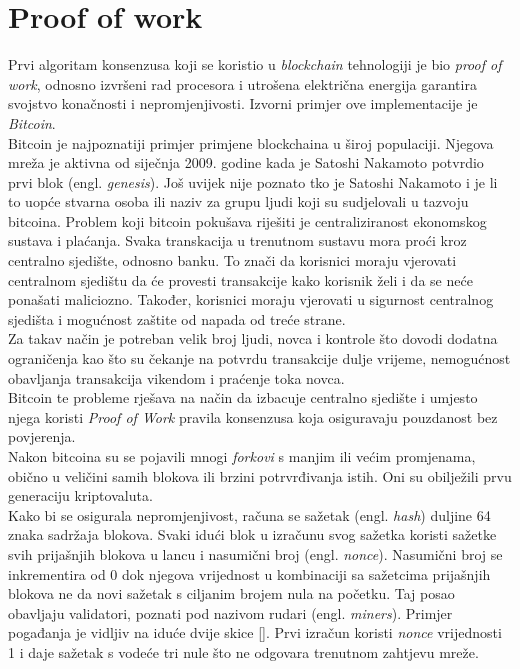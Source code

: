 \documentclass[times, utf8, zavrsni]{fer}
\begin{document}
\section{Proof of work}
Prvi algoritam konsenzusa koji se koristio u \emph{blockchain} tehnologiji je bio \emph{proof of work}, odnosno izvršeni rad procesora i utrošena električna energija
garantira svojstvo konačnosti i nepromjenjivosti. Izvorni primjer ove implementacije je \emph{Bitcoin}. \\
Bitcoin je najpoznatiji primjer primjene blockchaina u široj populaciji. Njegova mreža je aktivna 
od siječnja 2009. godine kada je Satoshi Nakamoto potvrdio prvi blok (engl. \emph{genesis}).
Još uvijek nije poznato tko je Satoshi Nakamoto i je li to uopće stvarna osoba ili naziv za grupu
ljudi koji su sudjelovali u tazvoju bitcoina. Problem koji bitcoin pokušava riješiti je centraliziranost
ekonomskog sustava i plaćanja. Svaka transkacija u trenutnom sustavu mora proći kroz centralno sjedište,
odnosno banku. To znači da korisnici moraju vjerovati centralnom sjedištu da će provesti transakcije
kako korisnik želi i da se neće ponašati maliciozno. Također, korisnici moraju vjerovati u sigurnost
centralnog sjedišta i mogućnost zaštite od napada od treće strane. \\
Za takav način je potreban velik broj ljudi, novca i kontrole što dovodi dodatna ograničenja kao što 
su čekanje na potvrdu transakcije dulje vrijeme, nemogućnost obavljanja transakcija vikendom i praćenje
toka novca. \\
Bitcoin te probleme rješava na način da izbacuje centralno sjedište i umjesto njega koristi \emph{Proof of Work}
pravila konsenzusa koja osiguravaju pouzdanost bez povjerenja. \\
Nakon bitcoina su se pojavili mnogi \emph{forkovi} s manjim ili većim promjenama, obično u veličini
samih blokova ili brzini potrvrđivanja istih. Oni su obilježili prvu generaciju kriptovaluta. \\
Kako bi se osigurala nepromjenjivost, računa se sažetak (engl. \emph{hash}) duljine 64 znaka sadržaja blokova. 
Svaki idući blok u izračunu svog sažetka koristi sažetke svih prijašnjih blokova u lancu i nasumični broj (engl. \emph{nonce}). Nasumični broj se inkrementira od 0
dok njegova vrijednost u kombinaciji sa sažetcima prijašnjih blokova ne da novi sažetak s ciljanim brojem nula na početku. Taj posao obavljaju validatori, poznati pod nazivom
rudari (engl. \emph{miners}). Primjer pogađanja je vidljiv na iduće dvije skice [\cite{PoWAsync}]. Prvi izračun koristi \emph{nonce} vrijednosti 1 i daje sažetak s vodeće
tri nule što ne odgovara trenutnom zahtjevu mreže.
\end{document}
